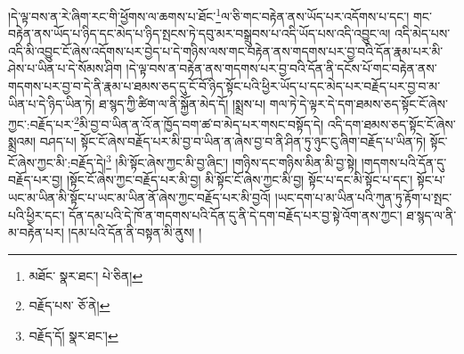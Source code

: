 །དེ་ལྟ་བས་ན་རེ་ཞིག་རང་གི་ཕྱོགས་ལ་ཆགས་པ་ཐོང་\footnote{མཐོང་  སྣར་ཐང་།  པེ་ཅིན། }ལ་ཅི་གང་བརྟེན་ནས་ཡོད་པར་འདོགས་པ་དང་། གང་བརྟེན་ནས་ཡོད་པ་ཉིད་དང་མེད་པ་ཉིད་སྤངས་ཏེ་དབུ་མར་བསྒྲུབས་པ་འདི་ཡོད་པས་འདི་འབྱུང་ལ། འདི་མེད་པས་འདི་མི་འབྱུང་ངོ་ཞེས་འདོགས་པར་བྱེད་པ་དེ་གཉིས་ལས་གང་བརྟེན་ནས་གདགས་པར་བྱ་བའི་དོན་རྣམ་པར་མི་ཤེས་པ་ཡིན་པ་དེ་སོམས་ཤིག །དེ་ལྟ་བས་ན་བརྟེན་ནས་གདགས་པར་བྱ་བའི་དོན་ནི་དངོས་པོ་གང་བརྟེན་ནས་གདགས་པར་བྱ་བ་དེ་ནི་རྣམ་པ་ཐམས་ཅད་དུ་ངོ་བོ་ཉིད་སྟོང་པའི་ཕྱིར་ཡོད་པ་དང་མེད་པར་བརྗོད་པར་བྱ་བ་མ་ཡིན་པ་དེ་ཉིད་ཡིན་ཏེ། ཐ་སྙད་ཀྱི་ཚིག་ལ་ནི་སྐྱོན་མེད་དོ། །སྨྲས་པ། གལ་ཏེ་དེ་ལྟར་དེ་དག་ཐམས་ཅད་སྟོང་ངོ་ཞེས་ཀྱང་:བརྗོད་པར་\footnote{བརྗོད་པས་  ཅོ་ནེ། }མི་བྱ་བ་ཡིན་ན་འོ་ན་ཁྱོད་བག་ཚ་བ་མེད་པར་གསང་བསྟོད་དེ། འདི་དག་ཐམས་ཅད་སྟོང་ངོ་ཞེས་སྨྲའམ། བཤད་པ། སྟོང་ངོ་ཞེས་བརྗོད་པར་མི་བྱ་བ་ཡིན་ན་ཞེས་བྱ་བ་ནི་ཤིན་ཏུ་ཉུང་ངུ་ཞིག་བརྗོད་པ་ཡིན་ཏེ། སྟོང་ངོ་ཞེས་ཀྱང་མི་:བརྗོད་དེ།\footnote{བརྗོད་དོ།  སྣར་ཐང་། } །མི་སྟོང་ཞེས་ཀྱང་མི་བྱ་ཞིང་། །གཉིས་དང་གཉིས་མིན་མི་བྱ་སྟེ། །གདགས་པའི་དོན་དུ་བརྗོད་པར་བྱ། །སྟོང་ངོ་ཞེས་ཀྱང་བརྗོད་པར་མི་བྱ། མི་སྟོང་ངོ་ཞེས་ཀྱང་མི་བྱ། སྟོང་པ་དང་མི་སྟོང་པ་དང་། སྟོང་པ་ཡང་མ་ཡིན་མི་སྟོང་པ་ཡང་མ་ཡིན་ནོ་ཞེས་ཀྱང་བརྗོད་པར་མི་བྱའོ། །ཡང་དག་པ་མ་ཡིན་པའི་ཀུན་ཏུ་རྟོག་པ་སྤང་པའི་ཕྱིར་དང་། དོན་དམ་པའི་དེ་ཁོ་ན་གདགས་པའི་དོན་དུ་ནི་དེ་དག་བརྗོད་པར་བྱ་སྟེ་འོག་ནས་ཀྱང་། ཐ་སྙད་ལ་ནི་མ་བརྟེན་པར། །དམ་པའི་དོན་ནི་བསྟན་མི་ནུས། །
